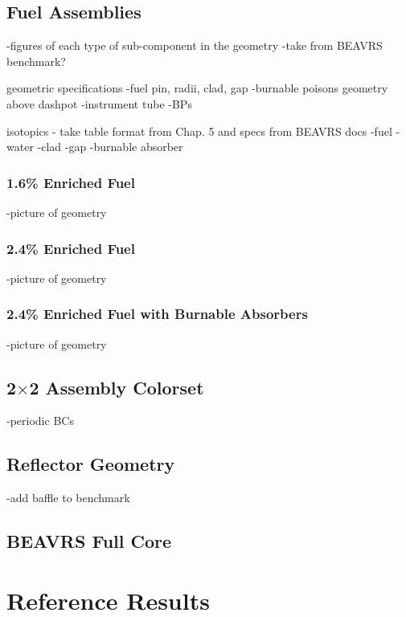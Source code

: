 \subsection{Fuel Assemblies}
\label{subsec:chap7-fuel-assms}

-figures of each type of sub-component in the geometry
-take from BEAVRS benchmark?

geometric specifications
-fuel pin, radii, clad, gap
-burnable poisons geometry above dashpot
-instrument tube
-\ac{BP}s

isotopics - take table format from Chap. 5 and specs from BEAVRS docs
-fuel
-water
-clad
-gap
-burnable absorber

\subsubsection{1.6\% Enriched Fuel}

-picture of geometry

\subsubsection{2.4\% Enriched Fuel}

-picture of geometry

\subsubsection{2.4\% Enriched Fuel with Burnable Absorbers}

-picture of geometry

\subsection{2$\times$2 Assembly Colorset}

-periodic BCs

\subsection{Reflector Geometry}

-add baffle to benchmark

\subsection{BEAVRS Full Core}


\section{Reference Results}
\label{sec:chap7-ref-results}

